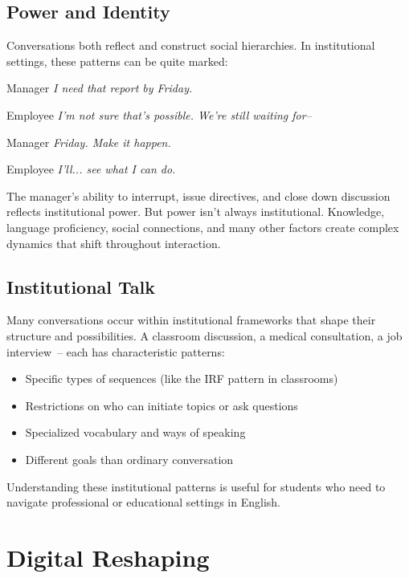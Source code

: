 \subsection{Power and Identity} \label{subsec:power}

Conversations both reflect and construct social hierarchies. In institutional settings, these patterns can be quite marked:

\ea
\begin{dialogue}
\item[Manager] \textit{I need that report by Friday.}
\item[Employee] \textit{I'm not sure that's possible. We're still waiting for--}
\item[Manager] \textit{Friday. Make it happen.}
\item[Employee] \textit{I'll... see what I can do.}
\end{dialogue}
\z
The manager's ability to interrupt, issue directives, and close down discussion reflects institutional power. But power isn't always institutional. Knowledge, language proficiency, social connections, and many other factors create complex dynamics that shift throughout interaction.

\subsection{Institutional Talk} \label{subsec:institutional}

Many conversations occur within institutional frameworks that shape their structure and possibilities. A classroom discussion, a medical consultation, a job interview~-- each has characteristic patterns:

\begin{itemize}[noitemsep]
\item Specific types of sequences (like the IRF pattern in classrooms)
\item Restrictions on who can initiate topics or ask questions  
\item Specialized vocabulary and ways of speaking
\item Different goals than ordinary conversation
\end{itemize}
Understanding these institutional patterns is useful for students who need to navigate professional or educational settings in English.

\section{Digital Reshaping} \label{sec:digital}

